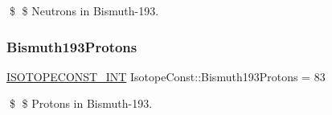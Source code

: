 \$ \$ Neutrons in Bismuth-\/193. \mbox{\label{group___isotope_const-_bismuth-_bi193_ga7258e823d525a36b6b438b63c4f68c3a}} 
\subsubsection{\texorpdfstring{Bismuth193\+Protons}{Bismuth193Protons}}
{\footnotesize\ttfamily \mbox{\hyperlink{group___isotope_const-_macros_ga5f18360b3e99483a35c32d789e62621c}{I\+S\+O\+T\+O\+P\+E\+C\+O\+N\+S\+T\+\_\+\+I\+NT}} Isotope\+Const\+::\+Bismuth193\+Protons = 83}

\$ \$ Protons in Bismuth-\/193. 